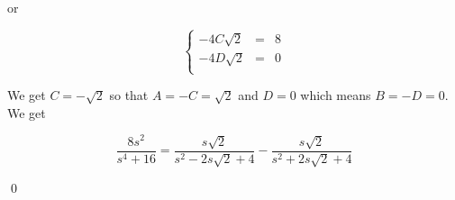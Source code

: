 \documentclass{ximera}
\begin{document}
\begin{example}
\begin{enumerate}
or 

\[ \left\{ \begin{array}{rcr}  -4C\sqrt{2}& = & 8 \\ -4D\sqrt{2} & = & 0 \\ \end{array} \right.\] 

We get $C = -\sqrt{2}$ so that $A = -C = \sqrt{2}$ and $D = 0$ which means $B = -D = 0$.  We get

\[ \frac{8s^2}{s^4+16} = \frac{s\sqrt{2}}{s^2 - 2s\sqrt{2} + 4} - \frac{s\sqrt{2}}{s^2 + 2s\sqrt{2} + 4}\]

\qed

\end{enumerate}

\end{example}



\closegraphsfile
\end{document}
